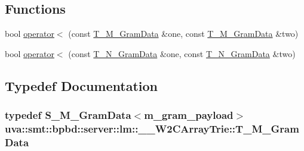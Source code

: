 \subsection*{Functions}
\begin{DoxyCompactItemize}
\item 
bool \hyperlink{namespaceuva_1_1smt_1_1bpbd_1_1server_1_1lm_1_1_____w2_c_array_trie_afcd65d6abbfe9635bf61187ab2a15a72}{operator$<$} (const \hyperlink{namespaceuva_1_1smt_1_1bpbd_1_1server_1_1lm_1_1_____w2_c_array_trie_a4d413639b142daeda71cdadbf01c2b87}{T\+\_\+\+M\+\_\+\+Gram\+Data} \&one, const \hyperlink{namespaceuva_1_1smt_1_1bpbd_1_1server_1_1lm_1_1_____w2_c_array_trie_a4d413639b142daeda71cdadbf01c2b87}{T\+\_\+\+M\+\_\+\+Gram\+Data} \&two)
\item 
bool \hyperlink{namespaceuva_1_1smt_1_1bpbd_1_1server_1_1lm_1_1_____w2_c_array_trie_ae5db6cc5e8ce62cf92f5031447d764e7}{operator$<$} (const \hyperlink{namespaceuva_1_1smt_1_1bpbd_1_1server_1_1lm_1_1_____w2_c_array_trie_aab5ccfad98e04de52009d53b4b55c9f1}{T\+\_\+\+N\+\_\+\+Gram\+Data} \&one, const \hyperlink{namespaceuva_1_1smt_1_1bpbd_1_1server_1_1lm_1_1_____w2_c_array_trie_aab5ccfad98e04de52009d53b4b55c9f1}{T\+\_\+\+N\+\_\+\+Gram\+Data} \&two)
\end{DoxyCompactItemize}


\subsection{Typedef Documentation}
\hypertarget{namespaceuva_1_1smt_1_1bpbd_1_1server_1_1lm_1_1_____w2_c_array_trie_a4d413639b142daeda71cdadbf01c2b87}{}
\subsubsection[{T\+\_\+\+M\+\_\+\+Gram\+Data}]{\setlength{\rightskip}{0pt plus 5cm}typedef {\bf S\+\_\+\+M\+\_\+\+Gram\+Data}$<${\bf m\+\_\+gram\+\_\+payload}$>$ {\bf uva\+::smt\+::bpbd\+::server\+::lm\+::\+\_\+\+\_\+\+W2\+C\+Array\+Trie\+::\+T\+\_\+\+M\+\_\+\+Gram\+Data}}\label{namespaceuva_1_1smt_1_1bpbd_1_1server_1_1lm_1_1_____w2_c_array_trie_a4d413639b142daeda71cdadbf01c2b87}


